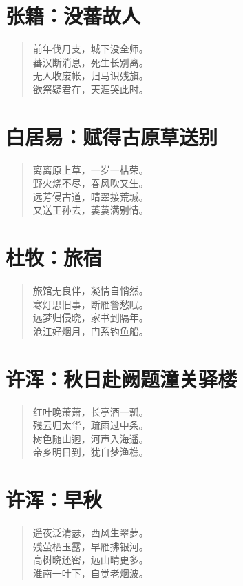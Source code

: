 \documentclass[12pt,oneside]{book}
\newenvironment{shici}{%
\begin{verse}\centering\yanti\large\hspace{12pt}}{\end{verse}}
\begin{document}
\begin{common-format}
\chapter{张籍：没蕃故人}
\begin{shici}
前年伐月支，城下没全师。\\
蕃汉断消息，死生长别离。\\
无人收废帐，归马识残旗。\\
欲祭疑君在，天涯哭此时。
\end{shici}

\chapter{白居易：赋得古原草送别}
\begin{shici}
离离原上草，一岁一枯荣。\\
野火烧不尽，春风吹又生。\\
远芳侵古道，晴翠接荒城。\\
又送王孙去，萋萋满别情。
\end{shici}

\chapter{杜牧：旅宿}
\begin{shici}
旅馆无良伴，凝情自悄然。\\
寒灯思旧事，断雁警愁眠。\\
远梦归侵晓，家书到隔年。\\
沧江好烟月，门系钓鱼船。
\end{shici}

\chapter{许浑：秋日赴阙题潼关驿楼}
\begin{shici}
红叶晚萧萧，长亭酒一瓢。\\
残云归太华，疏雨过中条。\\
树色随山迥，河声入海遥。\\
帝乡明日到，犹自梦渔樵。
\end{shici}

\chapter{许浑：早秋}
\begin{shici}
遥夜泛清瑟，西风生翠萝。\\
残萤栖玉露，早雁拂银河。\\
高树晓还密，远山晴更多。\\
淮南一叶下，自觉老烟波。
\end{shici}


\end{common-format}
\end{document}
